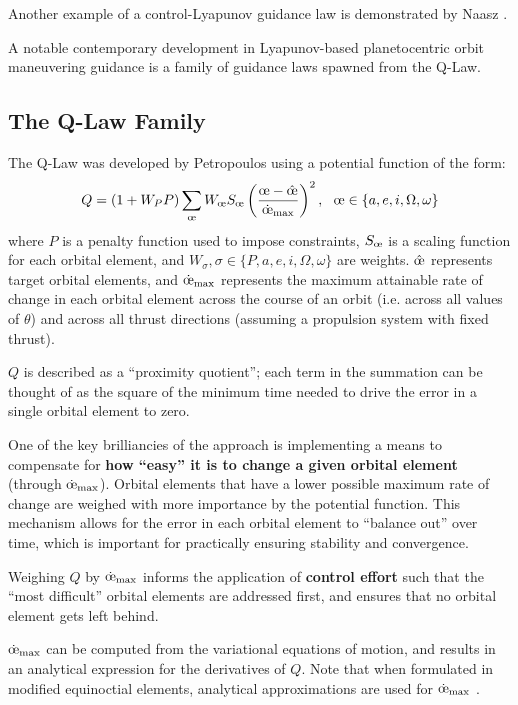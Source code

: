 Another example of a control-Lyapunov guidance law is demonstrated by Naasz \cite{naasz2002classical}.

A notable contemporary development in Lyapunov-based planetocentric orbit maneuvering guidance is a family of guidance laws spawned from the Q-Law.

\subsection{The Q-Law Family}
The Q-Law was developed by Petropoulos \cite{petropoulos2004low} using a potential function of the form:
\begin{equation}
  Q = (1 + W_P P) \sum_{\moe} W_\moe S_\moe \left(\frac{\moe - \hat{\moe}}{\dot{\moe}_{\max}} \right)^2, \ \  \moe \in \{a, e, i, \Omega, \omega\}
  \label{eq:q_law_petropulos}
\end{equation}
where \(P\) is a penalty function used to impose constraints, \(S_\moe\) is a scaling function for each orbital element, and \(W_\sigma, \sigma \in \{P, a, e, i, \Omega, \omega\}\) are weights. \(\hat{\moe}\) represents target orbital elements, and \(\dot{\moe}_{\max}\) represents the maximum attainable rate of change in each orbital element across the course of an orbit (i.e. across all values of \(\theta\)) and across all thrust directions (assuming a propulsion system with fixed thrust).

\(Q\) is described as a ``proximity quotient''; each term in the summation can be thought of as the square of the minimum time needed to drive the error in a single orbital element to zero.

One of the key brilliancies of the approach is implementing a means to compensate for \textbf{how ``easy'' it is to change a given orbital element} (through \(\dot{\moe}_{\max}\)). Orbital elements that have a lower possible maximum rate of change are weighed with more importance by the potential function. This mechanism allows for the error in each orbital element to ``balance out'' over time, which is important for practically ensuring stability and convergence.

Weighing \(Q\) by \(\dot{\moe}_{\max}\) informs the application of \textbf{control effort} such that the ``most difficult'' orbital elements are addressed first, and ensures that no orbital element gets left behind.

\(\dot{\moe}_{\max}\) can be computed from the variational equations of motion, and results in an analytical expression for the derivatives of \(Q\). Note that when formulated in modified equinoctial elements, analytical approximations are used for \(\dot{\moe}_{\max}\) \cite{vargaperez2016, sanjeev2023}.

